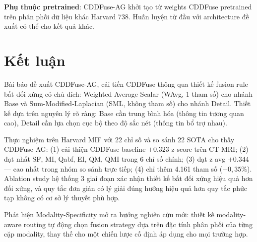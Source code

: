\documentclass[12pt,a4paper]{article}
\begin{document}
\textbf{Phụ thuộc pretrained}: CDDFuse-AG khởi tạo từ weights CDDFuse pretrained
trên phân phối dữ liệu khác Harvard 738. Huấn luyện từ đầu với architecture đề
xuất có thể cho kết quả khác.

\section{Kết luận}
\label{sec:conclusion}

Bài báo đề xuất CDDFuse-AG, cải tiến CDDFuse thông qua thiết kế fusion rule bất
đối xứng có chủ đích: Weighted Average Scalar (WAvg, 1 tham số) cho nhánh Base và
Sum-Modified-Laplacian (SML, không tham số) cho nhánh Detail. Thiết kế dựa trên
nguyên lý rõ ràng: Base cần trung bình hóa (thông tin tương quan cao), Detail cần
lựa chọn cục bộ theo độ sắc nét (thông tin bổ trợ nhau).

Thực nghiệm trên Harvard MIF với 22 chỉ số và so sánh 22 SOTA cho thấy CDDFuse-AG:
(1) cải thiện CDDFuse baseline $+0.323$ z-score trên CT-MRI; (2) đạt nhất SF, MI,
Qabf, EI, QM, QMI trong 6 chỉ số chính; (3) đạt z avg $+0.344$ --- cao nhất trong
nhóm so sánh trực tiếp; (4) chỉ thêm 4.161 tham số ($+0{,}35\%$). Ablation study
hệ thống 3 giai đoạn xác nhận thiết kế bất đối xứng hiệu quả hơn đối xứng, và
quy tắc đơn giản có lý giải đúng hướng hiệu quả hơn quy tắc phức tạp không có
cơ sở lý thuyết phù hợp.

Phát hiện Modality-Specificity mở ra hướng nghiên cứu mới: thiết kế modality-aware
routing tự động chọn fusion strategy dựa trên đặc tính phân phối của từng cặp
modality, thay thế cho một chiến lược cố định áp dụng cho mọi trường hợp.



\end{document}
